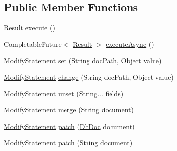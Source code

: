 \subsection*{Public Member Functions}
\begin{DoxyCompactItemize}
\item 
\mbox{\hyperlink{interfacecom_1_1mysql_1_1cj_1_1xdevapi_1_1_result}{Result}} \mbox{\hyperlink{classcom_1_1mysql_1_1cj_1_1xdevapi_1_1_modify_statement_impl_aebce34d0e71257dc9bf3264a6dd0e6cd}{execute}} ()
\item 
Completable\+Future$<$ \mbox{\hyperlink{interfacecom_1_1mysql_1_1cj_1_1xdevapi_1_1_result}{Result}} $>$ \mbox{\hyperlink{classcom_1_1mysql_1_1cj_1_1xdevapi_1_1_modify_statement_impl_ab4c612ba7dbd0552d3342d150756ee70}{execute\+Async}} ()
\item 
\mbox{\hyperlink{interfacecom_1_1mysql_1_1cj_1_1xdevapi_1_1_modify_statement}{Modify\+Statement}} \mbox{\hyperlink{classcom_1_1mysql_1_1cj_1_1xdevapi_1_1_modify_statement_impl_a4d22ce888e1c809740310f56cba2b6a3}{set}} (String doc\+Path, Object value)
\item 
\mbox{\hyperlink{interfacecom_1_1mysql_1_1cj_1_1xdevapi_1_1_modify_statement}{Modify\+Statement}} \mbox{\hyperlink{classcom_1_1mysql_1_1cj_1_1xdevapi_1_1_modify_statement_impl_abd17a3775a262741791dd5688a0e480e}{change}} (String doc\+Path, Object value)
\item 
\mbox{\hyperlink{interfacecom_1_1mysql_1_1cj_1_1xdevapi_1_1_modify_statement}{Modify\+Statement}} \mbox{\hyperlink{classcom_1_1mysql_1_1cj_1_1xdevapi_1_1_modify_statement_impl_ae2479079b83bdbefcabdf68380467a6d}{unset}} (String... fields)
\item 
\mbox{\hyperlink{interfacecom_1_1mysql_1_1cj_1_1xdevapi_1_1_modify_statement}{Modify\+Statement}} \mbox{\hyperlink{classcom_1_1mysql_1_1cj_1_1xdevapi_1_1_modify_statement_impl_acd828dfa9665ae9290662791d1e0da96}{merge}} (String document)
\item 
\mbox{\hyperlink{interfacecom_1_1mysql_1_1cj_1_1xdevapi_1_1_modify_statement}{Modify\+Statement}} \mbox{\hyperlink{classcom_1_1mysql_1_1cj_1_1xdevapi_1_1_modify_statement_impl_a685044daafc9ed7a37d743ac62db9465}{patch}} (\mbox{\hyperlink{interfacecom_1_1mysql_1_1cj_1_1xdevapi_1_1_db_doc}{Db\+Doc}} document)
\item 
\mbox{\hyperlink{interfacecom_1_1mysql_1_1cj_1_1xdevapi_1_1_modify_statement}{Modify\+Statement}} \mbox{\hyperlink{classcom_1_1mysql_1_1cj_1_1xdevapi_1_1_modify_statement_impl_a67bbbca2a519b79e54c1957e4d2f7c92}{patch}} (String document)

\end{DoxyCompactItemize}
